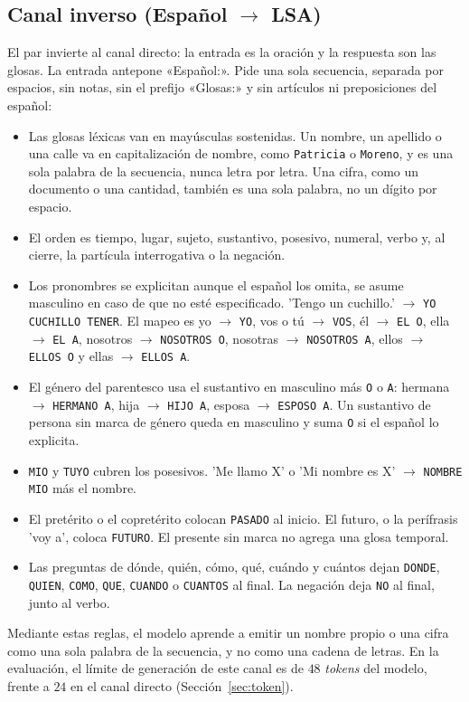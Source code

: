 \subsection{Canal inverso (Español $\rightarrow$ LSA)}
El par invierte al canal directo: la entrada es la oración y la respuesta son las glosas. La entrada antepone «Español:». Pide una sola secuencia, separada por espacios, sin notas, sin el prefijo «Glosas:» y sin artículos ni preposiciones del español:
\begin{itemize}
    \item Las glosas léxicas van en mayúsculas sostenidas. Un nombre, un apellido o una calle va en capitalización de nombre, como \texttt{Patricia} o \texttt{Moreno}, y es una sola palabra de la secuencia, nunca letra por letra. Una cifra, como un documento o una cantidad, también es una sola palabra, no un dígito por espacio.
    \item El orden es tiempo, lugar, sujeto, sustantivo, posesivo, numeral, verbo y, al cierre, la partícula interrogativa o la negación.
    \item Los pronombres se explicitan aunque el español los omita, se asume masculino en caso de que no esté especificado. 'Tengo un cuchillo.' $\rightarrow$ \texttt{YO CUCHILLO TENER}. El mapeo es yo $\rightarrow$ \texttt{YO}, vos o tú $\rightarrow$ \texttt{VOS}, él $\rightarrow$ \texttt{EL O}, ella $\rightarrow$ \texttt{EL A}, nosotros $\rightarrow$ \texttt{NOSOTROS O}, nosotras $\rightarrow$ \texttt{NOSOTROS A}, ellos $\rightarrow$ \texttt{ELLOS O} y ellas $\rightarrow$ \texttt{ELLOS A}. \item El género del parentesco usa el sustantivo en masculino más \texttt{O} o \texttt{A}: hermana $\rightarrow$ \texttt{HERMANO A}, hija $\rightarrow$ \texttt{HIJO A}, esposa $\rightarrow$ \texttt{ESPOSO A}. Un sustantivo de persona sin marca de género queda en masculino y suma \texttt{O} si el español lo explicita. 
    \item \texttt{MIO} y \texttt{TUYO} cubren los posesivos. 'Me llamo X' o 'Mi nombre es X' $\rightarrow$ \texttt{NOMBRE MIO} más el nombre. 
    \item El pretérito o el copretérito colocan \texttt{PASADO} al inicio. El futuro, o la perífrasis 'voy a', coloca \texttt{FUTURO}. El presente sin marca no agrega una glosa temporal.
    \item Las preguntas de dónde, quién, cómo, qué, cuándo y cuántos dejan \texttt{DONDE}, \texttt{QUIEN}, \texttt{COMO}, \texttt{QUE}, \texttt{CUANDO} o \texttt{CUANTOS} al final. La negación deja \texttt{NO} al final, junto al verbo.
\end{itemize}
Mediante estas reglas, el modelo aprende a emitir un nombre propio o una cifra como una sola palabra de la secuencia, y no como una cadena de letras. En la evaluación, el límite de generación de este canal es de $48$ \textit{tokens} del modelo, frente a $24$ en el canal directo (Sección~\ref{sec:token}).

